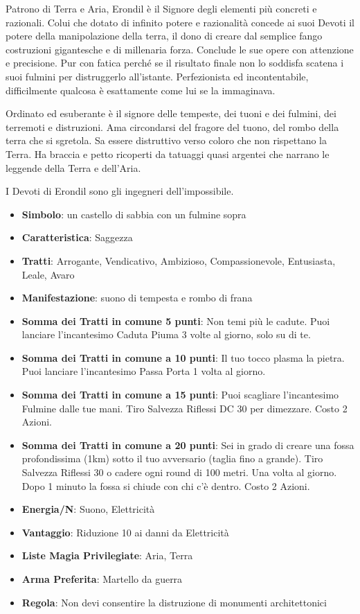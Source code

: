 \begin{multicols}{2}
Patrono di Terra e Aria, Erondil è il Signore degli elementi più concreti e razionali. Colui che dotato di infinito potere e razionalità concede ai suoi Devoti il potere della manipolazione della terra, il dono di creare dal semplice fango costruzioni gigantesche e di millenaria forza. Conclude le sue opere con attenzione e precisione.
Pur con fatica perché se il risultato finale non lo soddisfa scatena i suoi fulmini per distruggerlo all'istante. Perfezionista ed incontentabile, difficilmente qualcosa è esattamente come lui se la immaginava.

Ordinato ed esuberante è il signore delle tempeste, dei tuoni e dei fulmini, dei terremoti e distruzioni. Ama circondarsi del fragore del tuono, del rombo della terra che si sgretola. Sa essere distruttivo verso coloro che non rispettano la Terra.
Ha braccia e petto ricoperti da tatuaggi quasi argentei che narrano le leggende della Terra e dell'Aria.

I Devoti di Erondil sono gli ingegneri dell'impossibile.

\begin{itemize}[leftmargin=*] \setlength{\itemsep}{0pt}
\item \textbf{Simbolo}: un castello di sabbia con un fulmine sopra
\item \textbf{Caratteristica}: Saggezza
\item \textbf{Tratti}: Arrogante, Vendicativo, Ambizioso, Compassionevole, Entusiasta, Leale, Avaro
\item \textbf{Manifestazione}: suono di tempesta e rombo di frana
\item \textbf{Somma dei Tratti in comune 5 punti}: Non temi più le cadute. Puoi lanciare l'incantesimo Caduta Piuma 3 volte al giorno, solo su di te.
\item \textbf{Somma dei Tratti in comune a 10 punti}: Il tuo tocco plasma la pietra. Puoi lanciare l'incantesimo Passa Porta 1 volta al giorno.
\item \textbf{Somma dei Tratti in comune a 15 punti}: Puoi scagliare l'incantesimo Fulmine dalle tue mani. Tiro Salvezza Riflessi DC 30 per dimezzare. Costo 2 Azioni.
\item \textbf{Somma dei Tratti in comune a 20 punti}: Sei in grado di creare una fossa profondissima (1km) sotto il tuo avversario (taglia fino a grande). Tiro Salvezza Riflessi 30 o cadere ogni round di 100 metri. Una volta al giorno. Dopo 1 minuto la fossa si chiude con chi c'è dentro. Costo 2 Azioni.
\item \textbf{Energia/N}: Suono, Elettricità
\item \textbf{Vantaggio}: Riduzione 10 ai danni da Elettricità
\item \textbf{Liste Magia Privilegiate}: Aria, Terra
\item \textbf{Arma Preferita}: Martello da guerra
\item \textbf{Regola}: Non devi consentire la distruzione di monumenti architettonici
\end{itemize}


\end{multicols}
